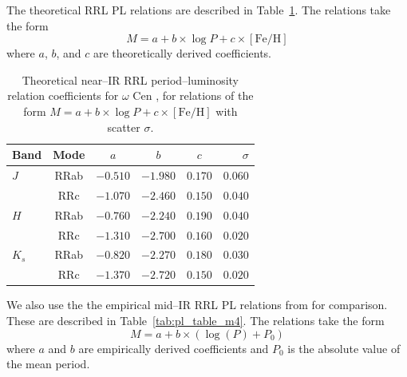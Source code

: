 \documentclass[a4paper,fleqn,usenatbib]{mnras}
\begin{document}
The theoretical RRL PL relations are described in Table~\ref{tab:pl_table_theo}. The relations take the form
\begin{equation}M = a + b\times\log P + c\times[\text{Fe/H}]\end{equation}
where $a$, $b$, and $c$ are theoretically derived coefficients.
\begin{table}
\centering
\caption{Theoretical near--IR RRL period--luminosity relation coefficients for $\omega$ Cen \citep{2015ApJ...808...50M}, for relations of the form $M = a + b \times \log P + c \times [\text{Fe/H}]$ with scatter $\sigma$.}
\label{tab:pl_table_theo}
\begin{tabular}{l||c|c|c|c|r} 
\hline \hline
Band & Mode & $a$   & $b$   & $c$   & $\sigma$ \\
\hline
$J$ & RRab & $-0.510$ & $-1.980$ & $0.170$ & $0.060$ \\
       & RRc & $-1.070$ & $-2.460$ & $0.150$ & $0.040$ \\
$H$ & RRab & $-0.760$ & $-2.240$ & $0.190$ & $0.040$\\
       & RRc & $-1.310$ & $-2.700$ & $0.160$ & $0.020$\\
$K_s$ & RRab & $-0.820$ & $-2.270$ & $0.180$ & $0.030$\\
           & RRc & $-1.370$ & $-2.720$ & $0.150$ & $0.020$ \\       
            \hline
\end{tabular}
\end{table}


We also use the the empirical mid--IR RRL PL relations from \citet{2015arXiv150507858N} for comparison. These are described in Table~\ref{tab:pl_table_m4}. The relations take the form
\begin{equation}M = a + b \times (\log (P) + P_0) \end{equation}
where $a$ and $b$ are empirically derived coefficients and $P_0$ is the absolute value of the mean period.
\end{document}
